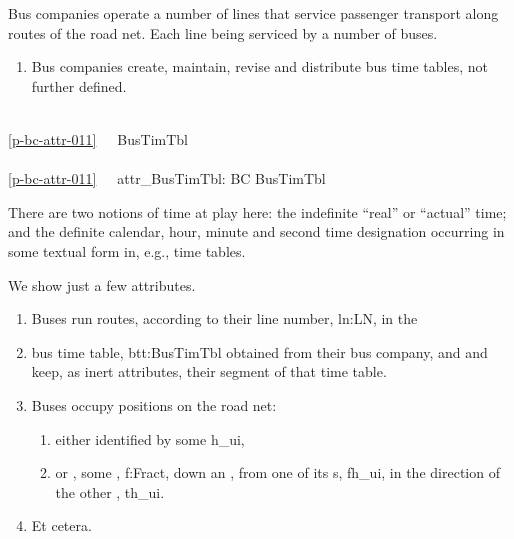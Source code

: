 {\HHHH
\begynd
\pind Bus companies operate a number of lines that service passenger
      transport along routes of the road net. Each line being serviced
      by a number of buses.
\afslut
\begin{enumerate}\setei
\item \label{p-bc-attr-011} Bus companies create, maintain, revise and
                          distribute  \nyl
                          bus time tables, not further defined.
\savei\end{enumerate}
\bp
{}\\
\ref{p-bc-attr-011}\ \ \ BusTimTbl \\
\ \ \ \\
\ref{p-bc-attr-011}\ \ \ attr\_BusTimTbl: BC {\RIGHTARROW} BusTimTbl
\ep

\noindent
\begynd
\pind There are two notions of time at play here:
\begynd
\pind the indefinite ``real'' or ``actual'' time; and
\pind the definite calendar, hour, minute and second time designation occurring
      in some textual form in, e.g., time tables.
\afslut
\afslut

 We show just a few attributes.

\begin{enumerate}\setei
\item \label{p-b-attr-000} Buses run routes, according to their line
                         number, \textsf{ln:LN}, in the 
\item \label{p-b-attr-010} bus time table, \textsf{btt:BusTimTbl}  obtained from their bus
                         company, and and keep, as inert attributes,
                         their segment of that time table.
\item \label{p-b-attr-020} Buses occupy positions on the road
                         net:
\begin{enumerate}
\item \label{p-b-attr-030} either  identified by some
                         \textsf{h\_ui}, %
\item \label{p-b-attr-040} or , some ,
                         \textsf{f:Fract}, %
                         down an , from one of
                         its s, \textsf{fh\_ui}, in the 
                         direction of the other ,
                         \textsf{th\_ui}.
\end{enumerate}
\item \label{p-b-attr-050} Et cetera.
\savei\end{enumerate}
\mnewfoil

}
